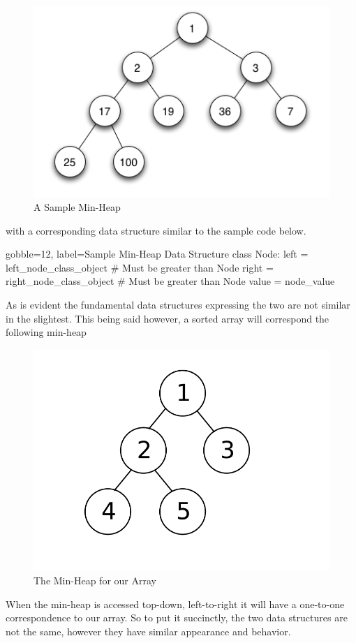\documentclass[10pt]{article}
\begin{document}
\begin{easylist}[enumerate]
        \begin{figure}[ht]
            \centering
            \includegraphics[scale=0.5]{img/Min-heap.png}
            \caption{A Sample Min-Heap}
        \end{figure}

    with a corresponding data structure similar to the sample code below.

    \vspace{5pt}\begin{pythoncode*}{gobble=12, label=Sample Min-Heap Data Structure}
            class Node:
                left = left_node_class_object   # Must be greater than Node
                right = right_node_class_object # Must be greater than Node
                value = node_value
        \end{pythoncode*}

    As is evident the fundamental data structures expressing the two are not similar in the slightest. This being said however, a sorted array will correspond the following min-heap

        \begin{figure}[ht]
            \centering
            \includegraphics[scale=0.3]{img/minheaparray.png}
            \caption{The Min-Heap for our Array}
        \end{figure}

    When the min-heap is accessed top-down, left-to-right it will have a one-to-one correspondence to our array. So to put it succinctly, the two data structures are not the same, however they have similar appearance and behavior.

\end{easylist}
\end{document}
